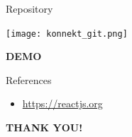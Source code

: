 \documentclass[14pt]{beamer}
\begin{document}
\begin{frame}{Repository}
	\begin{center}
	\texttt{[image: konnekt\_git.png]}
	\end{center}
\end{frame}

\begin{frame}
\begin{center}
	\textbf{\huge DEMO}
\end{center}
\end{frame}

\begin{frame}{References}
	\begin{itemize}
		\item \url {https://reactjs.org}
	\end{itemize}
\end{frame}

\begin{frame}
\begin{center}
	\textbf{\huge THANK YOU!}
\end{center}
\end{frame}
\end{document}
